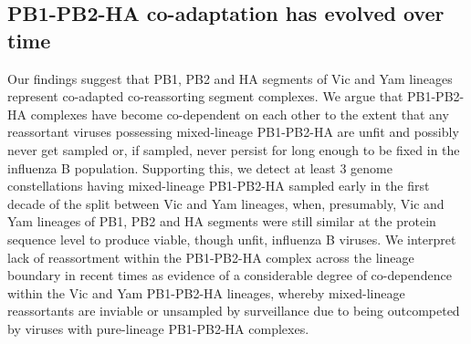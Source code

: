 \documentclass[11pt,oneside,letterpaper]{article}
\begin{document}
\subsection*{PB1-PB2-HA co-adaptation has evolved over time}
Our findings suggest that PB1, PB2 and HA segments of Vic and Yam lineages represent co-adapted co-reassorting segment complexes.
We argue that PB1-PB2-HA complexes have become co-dependent on each other to the extent that any reassortant viruses possessing mixed-lineage PB1-PB2-HA are unfit and possibly never get sampled or, if sampled, never persist for long enough to be fixed in the influenza B population.
Supporting this, we detect at least 3 genome constellations having mixed-lineage PB1-PB2-HA sampled early in the first decade of the split between Vic and Yam lineages, when, presumably, Vic and Yam lineages of PB1, PB2 and HA segments were still similar at the protein sequence level to produce viable, though unfit, influenza B viruses.
We interpret lack of reassortment within the PB1-PB2-HA complex across the lineage boundary in recent times as evidence of a considerable degree of co-dependence within the Vic and Yam PB1-PB2-HA lineages, whereby mixed-lineage reassortants are inviable or unsampled by surveillance due to being outcompeted by viruses with pure-lineage PB1-PB2-HA complexes.
\end{document}
